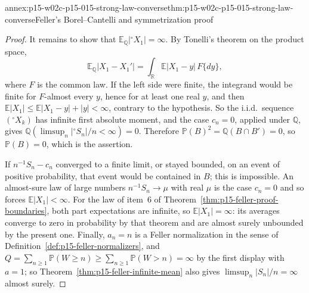 \begin{annexitem}{annex:p15-w02c-p15-015-strong-law-converse}{thm:p15-w02c-p15-015-strong-law-converse}{Feller's Borel--Cantelli and symmetrization proof}
\begin{proof}
It remains to show that \(\mathbb E_{\mathbb Q}|{}^{\circ}X_1|=\infty\).
By Tonelli's theorem on the product space,
\[
 \mathbb E_{\mathbb Q}|X_1-X_1'|
 =\int_{\mathbb R}\mathbb E|X_1-y|\,F\{dy\},
\]
where \(F\) is the common law. If the left side were finite, the
integrand would be finite for \(F\)-almost every \(y\), hence for at
least one real \(y\), and then
\(\mathbb E|X_1|\leq\mathbb E|X_1-y|+|y|<\infty\), contrary to the
hypothesis. So the i.i.d.\ sequence \(({}^{\circ}X_k)\) has infinite
first absolute moment, and the case \(c_n=0\), applied under
\(\mathbb Q\), gives \(\mathbb Q(\limsup_n|{}^{\circ}S_n|/n<\infty)=0\).
Therefore \(\mathbb P(B)^2=\mathbb Q(B\cap B')=0\), so
\(\mathbb P(B)=0\), which is the assertion.

If \(n^{-1}S_n-c_n\) converged to a finite limit, or stayed bounded, on
an event of positive probability, that event would be contained in
\(B\); this is impossible. An almost-sure law of large numbers
\(n^{-1}S_n\to\mu\) with real \(\mu\) is the case \(c_n=0\) and so
forces \(\mathbb E|X_1|<\infty\). For the law of item~6 of
Theorem~\ref{thm:p15-feller-proof-boundaries}, both part expectations
are infinite, so \(\mathbb E|X_1|=\infty\): its averages converge to zero
in probability by that theorem and are almost surely unbounded by the
present one. Finally, \(a_n=n\) is a Feller normalization in the sense
of Definition~\ref{def:p15-feller-normalizers}, and
\(Q=\sum_{n\geq1}\mathbb P(W\geq n)\geq\sum_{n\geq1}\mathbb P(W>n)=\infty\)
by the first display with \(a=1\); so
Theorem~\ref{thm:p15-feller-infinite-mean} also gives
\(\limsup_n|S_n|/n=\infty\) almost surely.
\end{proof}
\end{annexitem}

